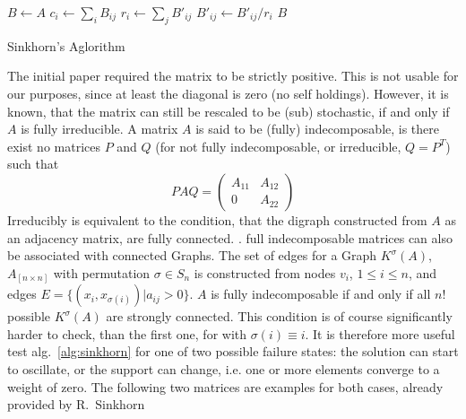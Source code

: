 \documentclass{article}
\begin{document}
\begin{algorithm}
\begin{algorithmic}
%
\State $B \gets A$
  \Repeat
        \State $c_i \gets \sum_i B_{ij}$
        \EndIf
        \State $r_i \gets \sum_j B'_{ij}$
        \State $B'_{ij} \gets B'_{ij}/r_i$
        \EndIf
  \Return $B$
\EndProcedure
\end{algorithmic}
\caption{Sinkhorn's Aglorithm}\label{alg:sinkhorn}
\end{algorithm}

The initial paper required the matrix to be strictly positive. This is not usable for our purposes, since at least the diagonal is zero (no self holdings).
However, it is known, that the matrix can still be rescaled to be (sub) stochastic, if and only if $A$ is fully irreducible.
A matrix $A$ is said to be (fully) indecomposable, is there exist no matrices $P$ and $Q$ (for not fully indecomposable, or irreducible, $Q = P^T$) such that
%
\begin{equation}
    P A Q = \begin{pmatrix}
        A_{11} & A_{12} \\
        0 & A_{22}
    \end{pmatrix}
\end{equation}
%
Irreducibly is equivalent to the condition, that the digraph constructed from $A$ as an adjacency matrix, are fully connected.
. 
full indecomposable matrices can also be associated with connected Graphs.
The set of edges for a Graph $K^\sigma(A)$, $A_{[n \times n]}$ with permutation $\sigma \in S_n$ is constructed from nodes $v_i$, $1 \leq i \leq n$, and edges $E = \{(x_i, x_{\sigma(i)}) | a_{ij} > 0 \}$. $A$ is fully indecomposable if and only if all $n!$ possible $K^\sigma(A)$ are strongly connected.
This condition is of course significantly harder to check, than the first one, for with $\sigma(i) \equiv i$.
It is therefore more useful test alg.~\ref{alg:sinkhorn} for one of two possible failure states: the solution can start to oscillate, or the support can change, i.e. one or more elements converge to a weight of zero.
The following two matrices are examples for both cases, already provided by R.~Sinkhorn~
\end{document}
